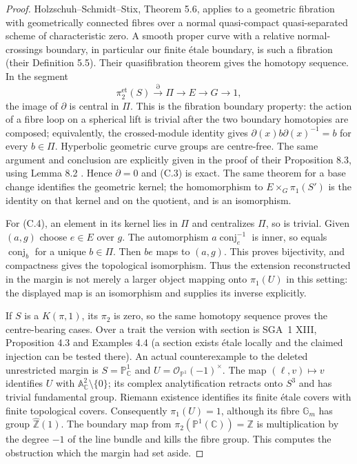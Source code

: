 \begin{proof}
Holzschuh--Schmidt--Stix, Theorem 5.6, applies to a geometric fibration
with geometrically connected fibres over a normal quasi-compact
quasi-separated scheme of characteristic zero. A smooth proper curve
with a relative normal-crossings boundary, in particular our finite
\'etale boundary, is such a fibration (their Definition 5.5). Their
quasifibration theorem gives the homotopy sequence. In the segment
\[
 \pi_2^{\mathrm{et}}(S)\xrightarrow\partial\Pi
                 \longrightarrow E\longrightarrow G\longrightarrow1,
\]
the image of $\partial$ is central in $\Pi$. This is the fibration
boundary property: the action of a fibre loop on a spherical lift is
trivial after the two boundary homotopies are composed; equivalently,
the crossed-module identity gives
$\partial(x)b\partial(x)^{-1}=b$ for every $b\in\Pi$.
Hyperbolic geometric curve groups are centre-free. The same argument
and conclusion are explicitly given in the proof of their Proposition
8.3, using Lemma 8.2 \cite{CF_HSS2026}. Hence $\partial=0$ and (C.3)
is exact. The same theorem for a base change identifies the geometric
kernel; the homomorphism to $E\times_G\pi_1(S')$ is the identity on
that kernel and on the quotient, and is an isomorphism.

For (C.4), an element in its kernel lies in $\Pi$ and centralizes
$\Pi$, so is trivial. Given $(a,g)$ choose $e\in E$ over $g$.
The automorphism $a\operatorname{conj}_e^{-1}$ is inner, so equals
$\operatorname{conj}_b$ for a unique $b\in\Pi$. Then $be$ maps to
$(a,g)$. This proves bijectivity, and compactness gives the topological
isomorphism. Thus the extension reconstructed in the margin is not
merely a larger object mapping onto $\pi_1(U)$ in this setting: the
displayed map is an isomorphism and supplies its inverse explicitly.

If $S$ is a $K(\pi,1)$, its $\pi_2$ is zero, so the same homotopy
sequence proves the centre-bearing cases. Over a trait the version
with section is SGA~1 XIII, Proposition 4.3 and Examples 4.4 (a section
exists \'etale locally and the claimed injection can be tested there).
An actual counterexample to the deleted unrestricted margin is
$S=\mathbb P^1_{\mathbb C}$ and
$U=\mathcal O_{\mathbb P^1}(-1)^\times$. The map
$(\ell,v)\mapsto v$ identifies $U$ with
$\mathbb A^2_{\mathbb C}\setminus\{0\}$; its complex analytification
retracts onto $S^3$ and has trivial fundamental group. Riemann existence
identifies its finite \'etale covers with finite topological covers.
Consequently $\pi_1(U)=1$, although its fibre $\mathbb G_m$ has group
$\widehat{\mathbb Z}(1)$. The boundary map from
$\pi_2(\mathbb P^1(\mathbb C))=\mathbb Z$ is multiplication by the
degree $-1$ of the line bundle and kills the fibre group. This computes
the obstruction which the margin had set aside.
\end{proof}

